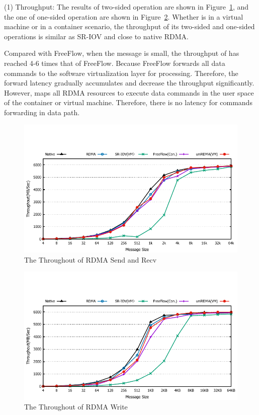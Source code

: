 (1) Throughput: The results of two-sided operation are shown in Figure~\ref{fig:send-bw}, and the one of one-sided operation are shown in Figure~\ref{fig:write-bw}. Whether \sys is in a virtual machine or in a container scenario, the throughput of its two-sided and one-sided operations is similar as SR-IOV and close to native RDMA.

Compared with FreeFlow, when the message is small, the throughput of \sys has reached 4-6 times that of FreeFlow. Because FreeFlow forwards all data commands to the software virtualization layer for processing. Therefore, the forward latency gradually accumulates and decrease the throughput significantly. However, \sys maps all RDMA resources to execute data commands in the user space of the container or virtual machine. Therefore, there is no latency for commands forwarding in data path.

\begin{figure}[!ht]
	\centering
	\includegraphics[width=1.0\linewidth]{images/send-bw.pdf}
	\caption{The Throughout of RDMA Send and Recv}
	\label{fig:send-bw}
\end{figure}

\begin{figure}[!ht]
	\centering
	\includegraphics[width=1.0\linewidth]{images/write-bw.pdf}
	\caption{The Throughout of RDMA Write}
	\label{fig:write-bw}
\end{figure}

